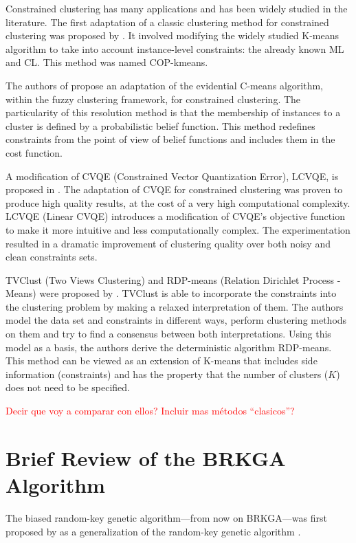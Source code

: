 \documentclass[review]{elsarticle}
\begin{document}
Constrained clustering has many applications and has been widely studied in the literature. The first adaptation of a classic clustering method for constrained clustering was proposed by \cite{wagstaff2001constrained}. It involved modifying the widely studied K-means algorithm to take into account instance-level constraints: the already known ML and CL. This method was named COP-kmeans.

The authors of \cite{antoine2012cecm} propose an adaptation of the evidential C-means algorithm, within the fuzzy clustering framework, for constrained clustering. The particularity of this resolution method is that the membership of instances to a cluster is defined by a probabilistic belief function. This method redefines constraints from the point of view of belief functions and includes them in the cost function.

A modification of CVQE (Constrained Vector Quantization Error), LCVQE, is proposed in \cite{pelleg2007k}. The adaptation of CVQE for constrained clustering was proven to produce high quality results, at the cost of a very high computational complexity. LCVQE (Linear CVQE) introduces a modification of CVQE's objective function to make it more intuitive and less computationally complex. The experimentation resulted in a dramatic improvement of clustering quality over both noisy and clean constraints sets.

TVClust (Two Views Clustering) and RDP-means (Relation Dirichlet Process - Means) were proposed by \cite{khashabi2015clustering}. TVClust is able to incorporate the constraints into the clustering problem by making a relaxed interpretation of them. The authors model the data set and constraints in different ways, perform clustering methods on them and try to find a consensus between both interpretations. Using this model as a basis, the authors derive the deterministic algorithm RDP-means. This method can be viewed as an extension of K-means that includes side information (constraints) and has the property that the number of clusters ($K$) does not need to be specified.

\textcolor{red}{Decir que voy a comparar con ellos? Incluir mas métodos ``clasicos''?}

\section{Brief Review of the BRKGA Algorithm}

The biased random-key genetic algorithm---from now on BRKGA---was first proposed by \cite{gonccalves2011biased} as a generalization of the random-key genetic algorithm \cite{bean1994genetic}.
\end{document}
